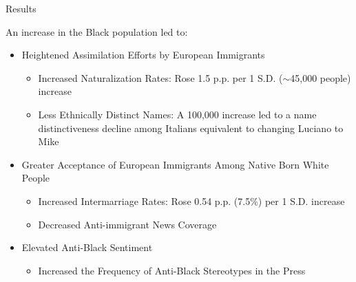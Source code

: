 \documentclass[11pt, aspectratio=169]{beamer}
\begin{document}

\begin{frame}{Results}

An increase in the Black population led to:

    \begin{itemize}
        \item Heightened Assimilation Efforts by European Immigrants
            \begin{itemize}
                \item Increased Naturalization Rates: Rose 1.5 p.p. per 1 S.D. ($\sim$45,000 people) increase
                \item Less Ethnically Distinct Names: A 100,000 increase led to a name distinctiveness decline among Italians equivalent to changing Luciano to Mike
            \end{itemize}
        \item Greater Acceptance of European Immigrants Among Native Born White People
            \begin{itemize}
                \item Increased Intermarriage Rates: Rose 0.54 p.p. (7.5\%) per 1 S.D. increase
                \item Decreased Anti-immigrant News Coverage
            \end{itemize}
        \item Elevated Anti-Black Sentiment
            \begin{itemize}
                \item Increased the Frequency of Anti-Black Stereotypes in the Press
            \end{itemize}
    \end{itemize}

\end{frame}

\end{document}
